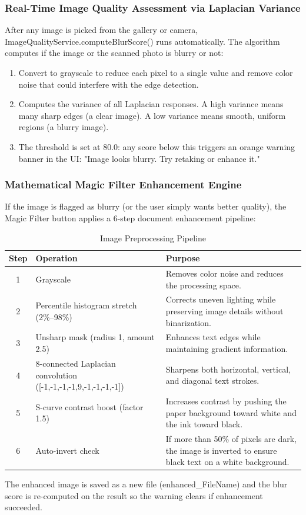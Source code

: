 \subsubsection{Real-Time Image Quality Assessment via Laplacian Variance}
After any image is picked from the gallery or camera, ImageQualityService.computeBlurScore() runs automatically. The algorithm computes if the image or the scanned photo is blurry or not:
\begin{enumerate}
    \item Convert to grayscale to reduce each pixel to a single value and remove color noise that could interfere with the edge detection.
    \item Computes the variance of all Laplacian responses. A high variance means many sharp edges (a clear image). A low variance means smooth, uniform regions (a blurry image).
    \item The threshold is set at 80.0: any score below this triggers an orange warning banner in the UI: "Image looks blurry. Try retaking or enhance it."
\end{enumerate}

\subsubsection{Mathematical Magic Filter Enhancement Engine}
If the image is flagged as blurry (or the user simply wants better quality), the Magic Filter button applies a 6-step document enhancement pipeline:
\begin{table}[H]
\centering
\caption{Image Preprocessing Pipeline}
\label{tab:image_preprocessing}
\begin{tabular}{|c|p{4cm}|p{8cm}|}
\hline
\textbf{Step} & \textbf{Operation} & \textbf{Purpose} \\ \hline
1 & Grayscale & Removes color noise and reduces the processing space. \\ \hline
2 & Percentile histogram stretch (2\%--98\%) & Corrects uneven lighting while preserving image details without binarization. \\ \hline
3 & Unsharp mask (radius 1, amount 2.5) & Enhances text edges while maintaining gradient information. \\ \hline
4 & 8-connected Laplacian convolution ([-1,-1,-1,-1,9,-1,-1,-1,-1]) & Sharpens both horizontal, vertical, and diagonal text strokes. \\ \hline
5 & S-curve contrast boost (factor 1.5) & Increases contrast by pushing the paper background toward white and the ink toward black. \\ \hline
6 & Auto-invert check & If more than 50\% of pixels are dark, the image is inverted to ensure black text on a white background. \\ \hline
\end{tabular}
\end{table}
The enhanced image is saved as a new file (enhanced\_FileName) and the blur score is re-computed on the result so the warning clears if enhancement succeeded.


